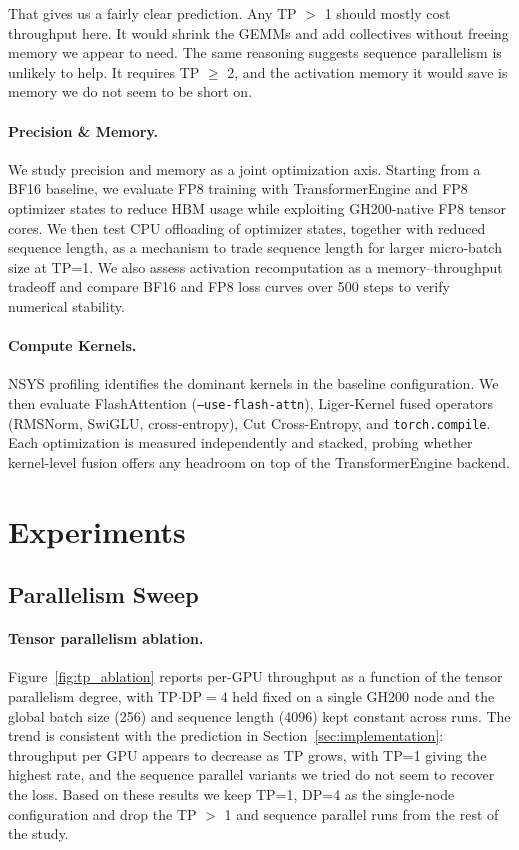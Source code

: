 \documentclass[10pt,twocolumn,letterpaper]{article}
\begin{document}
That gives us a fairly clear prediction. Any TP $>$ 1 should mostly cost throughput here. It would shrink the GEMMs and add collectives without freeing memory we appear to need. The same reasoning suggests sequence parallelism is unlikely to help. It requires TP $\geq$ 2, and the activation memory it would save is memory we do not seem to be short on.

\paragraph{Precision \& Memory.}
We study precision and memory as a joint optimization axis. Starting from a BF16
baseline, we evaluate FP8 training with TransformerEngine and FP8 optimizer states
to reduce HBM usage while exploiting GH200-native FP8 tensor cores. We then test CPU
offloading of optimizer states, together with reduced sequence length, as a mechanism
to trade sequence length for larger micro-batch size at TP=1. We also assess activation
recomputation as a memory--throughput tradeoff and compare BF16 and FP8 loss curves
over 500 steps to verify numerical stability.
\paragraph{Compute Kernels.}
NSYS profiling identifies the dominant kernels in the baseline configuration. We then evaluate FlashAttention (\texttt{--use-flash-attn}), Liger-Kernel fused operators (RMSNorm, SwiGLU, cross-entropy), Cut Cross-Entropy, and \texttt{torch.compile}. Each optimization is measured independently and stacked, probing whether kernel-level fusion offers any headroom on top of the TransformerEngine backend.

\section{Experiments}
\label{sec:experiments}

\subsection{Parallelism Sweep}

\paragraph{Tensor parallelism ablation.}
Figure~\ref{fig:tp_ablation} reports per-GPU throughput as a function of the tensor parallelism degree, with TP$\cdot$DP$=4$ held fixed on a single GH200 node and the global batch size (256) and sequence length (4096) kept constant across runs. The trend is consistent with the prediction in Section~\ref{sec:implementation}: throughput per GPU appears to decrease as TP grows, with TP=1 giving the highest rate, and the sequence parallel variants we tried do not seem to recover the loss. Based on these results we keep TP=1, DP=4 as the single-node configuration and drop the TP $>$ 1 and sequence parallel runs from the rest of the study.
\end{document}
